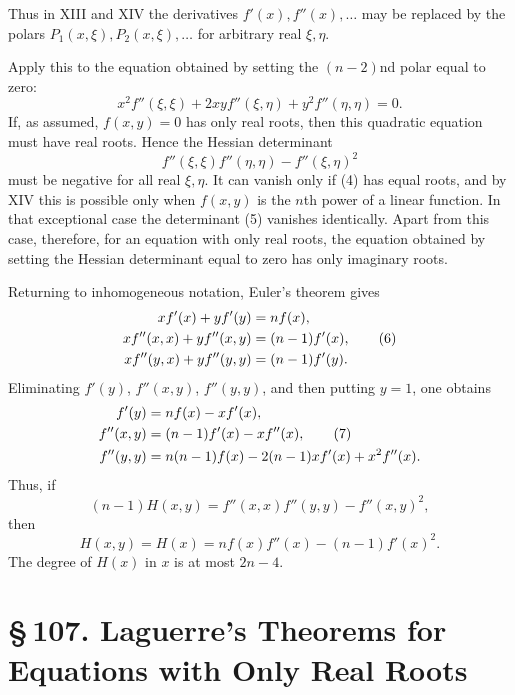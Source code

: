 \documentclass[11pt]{article}
\providecommand{\sect}[2]{\section*{\S\,#1. #2}}
\begin{document}
Thus in XIII and XIV the derivatives $f'(x),f''(x),\ldots$ may be replaced by the polars $P_1(x,\xi),P_2(x,\xi),\ldots$ for arbitrary real $\xi,\eta$.

Apply this to the equation obtained by setting the $(n-2)$nd polar equal to zero:
\begin{equation}
        x^2f''(\xi,\xi)+2xyf''(\xi,\eta)+y^2f''(\eta,\eta)=0.
\tag{4}
\end{equation}
If, as assumed, $f(x,y)=0$ has only real roots, then this quadratic equation must have real roots. Hence the Hessian determinant
\begin{equation}
        f''(\xi,\xi)f''(\eta,\eta)-f''(\xi,\eta)^2
\tag{5}
\end{equation}
must be negative for all real $\xi,\eta$. It can vanish only if (4) has equal roots, and by XIV this is possible only when $f(x,y)$ is the $n$th power of a linear function. In that exceptional case the determinant (5) vanishes identically. Apart from this case, therefore, for an equation with only real roots, the equation obtained by setting the Hessian determinant equal to zero has only imaginary roots.

Returning to inhomogeneous notation, Euler's theorem gives
\begin{align}
        xf'(x)+yf'(y)&=nf(x),\notag\\
        xf''(x,x)+yf''(x,y)&=(n-1)f'(x),\tag{6}\\
        xf''(y,x)+yf''(y,y)&=(n-1)f'(y).\notag
\end{align}
Eliminating $f'(y)$, $f''(x,y)$, $f''(y,y)$, and then putting $y=1$, one obtains
\begin{align}
        f'(y)&=nf(x)-xf'(x),\notag\\
        f''(x,y)&=(n-1)f'(x)-xf''(x),\tag{7}\\
        f''(y,y)&=n(n-1)f(x)-2(n-1)xf'(x)+x^2f''(x).
\notag
\end{align}
Thus, if
\begin{equation}
        (n-1)H(x,y)=f''(x,x)f''(y,y)-f''(x,y)^2,
\tag{8}
\end{equation}
then
\begin{equation}
        H(x,y)=H(x)=n f(x)f''(x)-(n-1)f'(x)^2.
\tag{9}
\end{equation}
The degree of $H(x)$ in $x$ is at most $2n-4$.

\sect{107}{Laguerre's Theorems for Equations with Only Real Roots}
\end{document}
